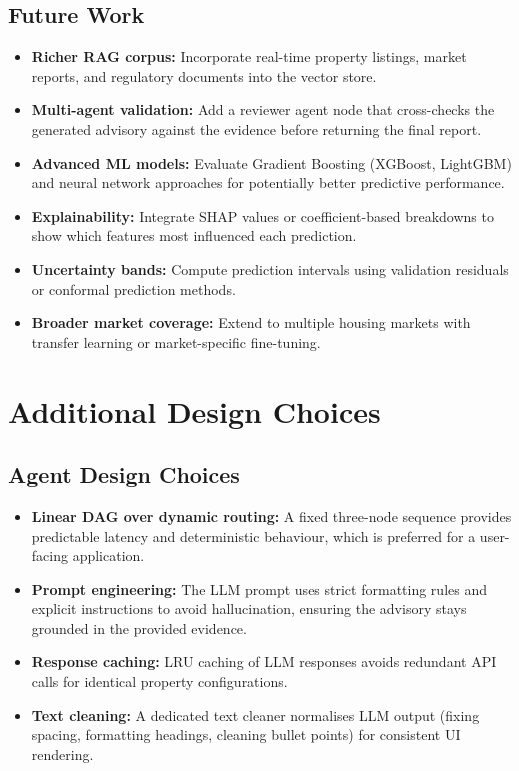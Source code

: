 \documentclass[11pt,a4paper]{article}
\begin{document}
\subsection{Future Work}

\begin{itemize}[leftmargin=*]
    \item \textbf{Richer RAG corpus:} Incorporate real-time property listings, market reports, and regulatory documents into the vector store.
    \item \textbf{Multi-agent validation:} Add a reviewer agent node that cross-checks the generated advisory against the evidence before returning the final report.
    \item \textbf{Advanced ML models:} Evaluate Gradient Boosting (XGBoost, LightGBM) and neural network approaches for potentially better predictive performance.
    \item \textbf{Explainability:} Integrate SHAP values or coefficient-based breakdowns to show which features most influenced each prediction.
    \item \textbf{Uncertainty bands:} Compute prediction intervals using validation residuals or conformal prediction methods.
    \item \textbf{Broader market coverage:} Extend to multiple housing markets with transfer learning or market-specific fine-tuning.
\end{itemize}

\section{Additional Design Choices}

\subsection{Agent Design Choices}

\begin{itemize}[leftmargin=*]
    \item \textbf{Linear DAG over dynamic routing:} A fixed three-node sequence provides predictable latency and deterministic behaviour, which is preferred for a user-facing application.
    \item \textbf{Prompt engineering:} The LLM prompt uses strict formatting rules and explicit instructions to avoid hallucination, ensuring the advisory stays grounded in the provided evidence.
    \item \textbf{Response caching:} LRU caching of LLM responses avoids redundant API calls for identical property configurations.
    \item \textbf{Text cleaning:} A dedicated text cleaner normalises LLM output (fixing spacing, formatting headings, cleaning bullet points) for consistent UI rendering.
\end{itemize}
\end{document}

